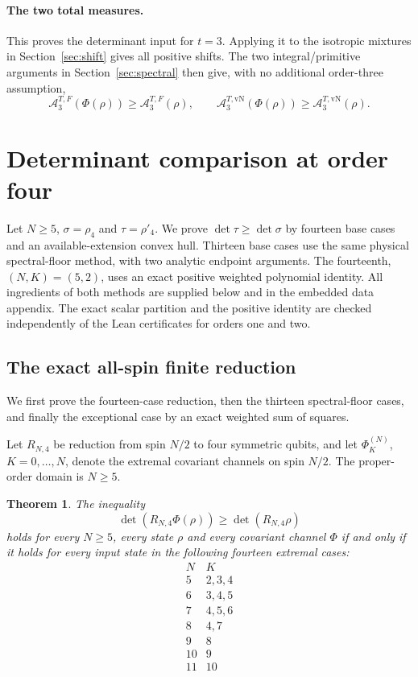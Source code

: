 \documentclass[11pt,a4paper]{article}
\newcommand{\A}{\mathcal A}
\newtheorem{theorem}{Theorem}
\begin{document}
\paragraph{The two total measures.}
This proves the determinant input for $t=3$. Applying it to the isotropic
mixtures in Section~\ref{sec:shift} gives all positive shifts. The two
integral/primitive arguments in Section~\ref{sec:spectral} then give,
with no additional order-three assumption,
\[
 \A_3^{T,F}(\Phi(\rho))\ge\A_3^{T,F}(\rho),\qquad
 \A_3^{T,\mathrm{vN}}(\Phi(\rho))\ge\A_3^{T,\mathrm{vN}}(\rho).
\]

\clearpage
\section{Determinant comparison at order four}\label{sec:t4}
Let $N\ge5$, $\sigma=\rho_4$ and $\tau=\rho'_4$. We prove
$\det\tau\ge\det\sigma$ by fourteen base cases and an available-extension
convex hull. Thirteen base cases use the same physical spectral-floor
method, with two analytic endpoint arguments. The fourteenth,
$(N,K)=(5,2)$, uses an exact positive weighted polynomial identity.
All ingredients of both methods are supplied below and in the embedded
data appendix. The exact scalar partition and the positive identity are checked
independently of the Lean certificates for orders one and two.

\subsection{The exact all-spin finite reduction}
We first prove the fourteen-case reduction, then the thirteen spectral-floor
cases, and finally the exceptional case by an exact weighted sum of squares.

Let $R_{N,4}$ be reduction from spin $N/2$ to four symmetric qubits,
and let $\Phi_K^{(N)}$, $K=0,\ldots,N$, denote the extremal covariant
channels on spin $N/2$. The proper-order domain is $N\ge5$.

\begin{theorem}
The inequality
\[
 \det(R_{N,4}\Phi(\rho))\ge\det(R_{N,4}\rho)
\]
holds for every $N\ge5$, every state $\rho$ and every covariant
channel $\Phi$ if and only if it holds for every input state in
the following fourteen extremal cases:
\[
\begin{array}{c|l}
 N&K\\\hline
 5&2,3,4\\
 6&3,4,5\\
 7&4,5,6\\
 8&4,7\\
 9&8\\
 10&9\\
 11&10
\end{array}
\]
\end{theorem}
\end{document}
